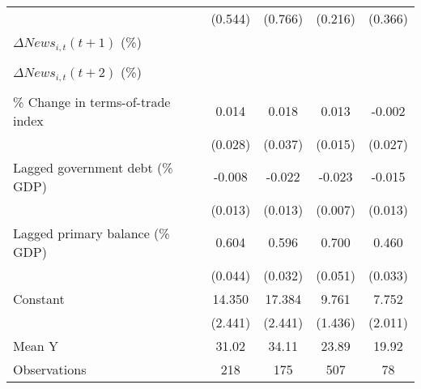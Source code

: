 {\begin{tabular}{l*{4}{c}}
                    &     (0.544)         &     (0.766)         &     (0.216)         &     (0.366)         \\
\addlinespace
$ \Delta News_{i,t}(t+1)$ (\%)&                     &                     &                     &                     \\
                    &                     &                     &                     &                     \\
\addlinespace
$ \Delta News_{i,t}(t+2)$ (\%)&                     &                     &                     &                     \\
                    &                     &                     &                     &                     \\
\addlinespace
\% Change in terms-of-trade index&       0.014         &       0.018         &       0.013         &      -0.002         \\
                    &     (0.028)         &     (0.037)         &     (0.015)         &     (0.027)         \\
\addlinespace
Lagged government debt (\% GDP)&      -0.008         &      -0.022         &      -0.023\sym{***}&      -0.015         \\
                    &     (0.013)         &     (0.013)         &     (0.007)         &     (0.013)         \\
\addlinespace
Lagged primary balance (\% GDP)&       0.604\sym{***}&       0.596\sym{***}&       0.700\sym{***}&       0.460\sym{***}\\
                    &     (0.044)         &     (0.032)         &     (0.051)         &     (0.033)         \\
\addlinespace
Constant            &      14.350\sym{***}&      17.384\sym{***}&       9.761\sym{***}&       7.752\sym{***}\\
                    &     (2.441)         &     (2.441)         &     (1.436)         &     (2.011)         \\
\midrule
Mean Y              &       31.02         &       34.11         &       23.89         &       19.92         \\
Observations        &         218         &         175         &         507         &          78         \\
\bottomrule
\end{tabular}
}
